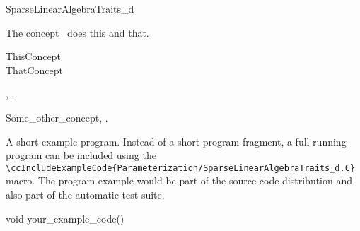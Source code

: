 

\begin{ccRefConcept}{SparseLinearAlgebraTraits_d}


\ccDefinition
  
The concept \ccRefName\ does this and that.

\ccGeneralizes

ThisConcept \\
ThatConcept

\ccTypes


\ccCreation
{}  %


\ccOperations


\ccHasModels

,
.

\ccSeeAlso

Some\_other\_concept,
.

\ccExample

A short example program.
Instead of a short program fragment, a full running program can be
included using the 
\verb|\ccIncludeExampleCode{Parameterization/SparseLinearAlgebraTraits_d.C}| 
macro. The program example would be part of the source code distribution and
also part of the automatic test suite.

\begin{ccExampleCode}
void your_example_code() {
}
\end{ccExampleCode}


\end{ccRefConcept}


